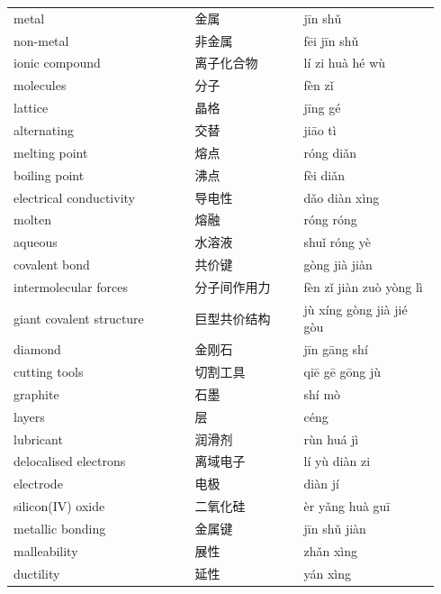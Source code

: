 \documentclass[11pt]{article}
\begin{document}
\begin{longtable}{@{}p{0.40\linewidth}p{0.24\linewidth}p{0.30\linewidth}@{}}
metal & 金属 & jīn shǔ \\
non-metal & 非金属 & fēi jīn shǔ \\
ionic compound & 离子化合物 & lí zi huà hé wù \\
molecules & 分子 & fèn zǐ \\
lattice & 晶格 & jīng gé \\
alternating & 交替 & jiāo tì \\
melting point & 熔点 & róng diǎn \\
boiling point & 沸点 & fèi diǎn \\
electrical conductivity & 导电性 & dǎo diàn xìng \\
molten & 熔融 & róng róng \\
aqueous & 水溶液 & shuǐ róng yè \\
covalent bond & 共价键 & gòng jià jiàn \\
intermolecular forces & 分子间作用力 & fèn zǐ jiàn zuò yòng lì \\
giant covalent structure & 巨型共价结构 & jù xíng gòng jià jié gòu \\
diamond & 金刚石 & jīn gāng shí \\
cutting tools & 切割工具 & qiē gē gōng jù \\
graphite & 石墨 & shí mò \\
layers & 层 & céng \\
lubricant & 润滑剂 & rùn huá jì \\
delocalised electrons & 离域电子 & lí yù diàn zi \\
electrode & 电极 & diàn jí \\
silicon(IV) oxide & 二氧化硅 & èr yǎng huà guī \\
metallic bonding & 金属键 & jīn shǔ jiàn \\
malleability & 展性 & zhǎn xìng \\
ductility & 延性 & yán xìng \\
\end{longtable}
\end{document}
